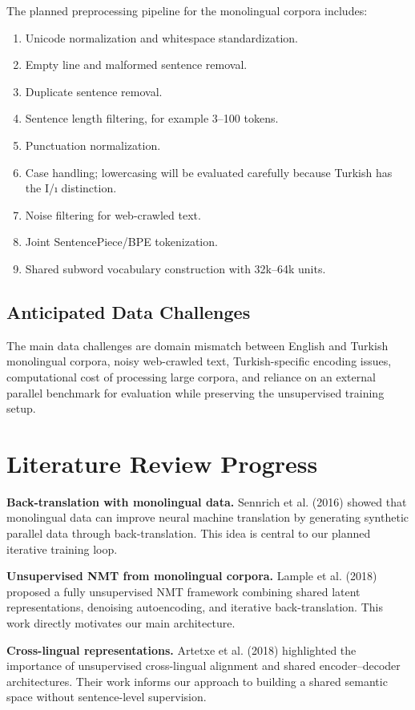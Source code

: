 \documentclass[11pt]{article}
\begin{document}
The planned preprocessing pipeline for the monolingual corpora includes:
\begin{enumerate}
    \item Unicode normalization and whitespace standardization.
    \item Empty line and malformed sentence removal.
    \item Duplicate sentence removal.
    \item Sentence length filtering, for example 3--100 tokens.
    \item Punctuation normalization.
    \item Case handling; lowercasing will be evaluated carefully because Turkish has the I/ı distinction.
    \item Noise filtering for web-crawled text.
    \item Joint SentencePiece/BPE tokenization.
    \item Shared subword vocabulary construction with 32k--64k units.
\end{enumerate}

\subsection{Anticipated Data Challenges}

The main data challenges are domain mismatch between English and Turkish monolingual corpora, noisy web-crawled text, Turkish-specific encoding issues, computational cost of processing large corpora, and reliance on an external parallel benchmark for evaluation while preserving the unsupervised training setup.

\section{Literature Review Progress}

\textbf{Back-translation with monolingual data.} Sennrich et al. (2016) showed that monolingual data can improve neural machine translation by generating synthetic parallel data through back-translation. This idea is central to our planned iterative training loop.

\textbf{Unsupervised NMT from monolingual corpora.} Lample et al. (2018) proposed a fully unsupervised NMT framework combining shared latent representations, denoising autoencoding, and iterative back-translation. This work directly motivates our main architecture.

\textbf{Cross-lingual representations.} Artetxe et al. (2018) highlighted the importance of unsupervised cross-lingual alignment and shared encoder--decoder architectures. Their work informs our approach to building a shared semantic space without sentence-level supervision.
\end{document}
